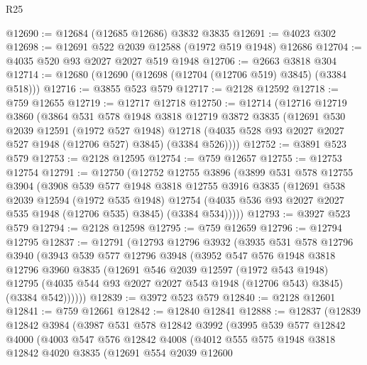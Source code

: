 \begin{lexlean}{R25}
\begin{coremodule}
@12690 := @12684 (@12685 @12686) @3832 @3835
@12691 := @4023 @302
@12698 := @12691 @522 @2039 @12588 (@1972 @519 @1948) @12686
@12704 := @4035 @520 @93 @2027 @2027 @519 @1948
@12706 := @2663 @3818 @304
@12714 := @12680 (@12690 (@12698 (@12704 (@12706 @519) @3845) (@3384 @518)))
@12716 := @3855 @523 @579
@12717 := @2128 @12592
@12718 := @759 @12655
@12719 := @12717 @12718
@12750 := @12714
    (@12716
      @12719
      @3860
      (@3864
        @531
        @578
        @1948
        @3818
        @12719
        @3872
        @3835
        (@12691
          @530
          @2039
          @12591
          (@1972 @527 @1948)
          @12718
          (@4035 @528 @93 @2027 @2027 @527 @1948 (@12706 @527) @3845)
          (@3384 @526))))
@12752 := @3891 @523 @579
@12753 := @2128 @12595
@12754 := @759 @12657
@12755 := @12753 @12754
@12791 := @12750
    (@12752
      @12755
      @3896
      (@3899
        @531
        @578
        @12755
        @3904
        (@3908
          @539
          @577
          @1948
          @3818
          @12755
          @3916
          @3835
          (@12691
            @538
            @2039
            @12594
            (@1972 @535 @1948)
            @12754
            (@4035 @536 @93 @2027 @2027 @535 @1948 (@12706 @535) @3845)
            (@3384 @534)))))
@12793 := @3927 @523 @579
@12794 := @2128 @12598
@12795 := @759 @12659
@12796 := @12794 @12795
@12837 := @12791
    (@12793
      @12796
      @3932
      (@3935
        @531
        @578
        @12796
        @3940
        (@3943
          @539
          @577
          @12796
          @3948
          (@3952
            @547
            @576
            @1948
            @3818
            @12796
            @3960
            @3835
            (@12691
              @546
              @2039
              @12597
              (@1972 @543 @1948)
              @12795
              (@4035 @544 @93 @2027 @2027 @543 @1948 (@12706 @543) @3845)
              (@3384 @542))))))
@12839 := @3972 @523 @579
@12840 := @2128 @12601
@12841 := @759 @12661
@12842 := @12840 @12841
@12888 := @12837
    (@12839
      @12842
      @3984
      (@3987
        @531
        @578
        @12842
        @3992
        (@3995
          @539
          @577
          @12842
          @4000
          (@4003
            @547
            @576
            @12842
            @4008
            (@4012
              @555
              @575
              @1948
              @3818
              @12842
              @4020
              @3835
              (@12691
                @554
                @2039
                @12600

\end{coremodule}
\end{lexlean}
